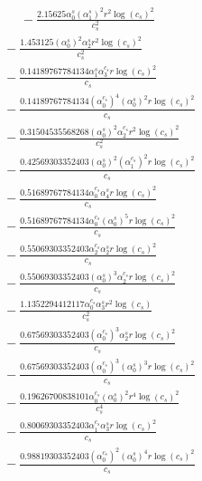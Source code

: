 \documentclass[10pt]{article}
\begin{document}
\begin{align*}
\phantom{R_{3,7}} &\phantom{={}}{}  - \frac{2.15625 \alpha_{0}^s \left(\alpha_{1}^s\right)^{2} r^{2} \log{\left(c_{s} \right)}^{2}}{c_{s}^{2}} \\
&{}  - \frac{1.453125 \left(\alpha_{0}^s\right)^{2} \alpha_{2}^s r^{2} \log{\left(c_{s} \right)}^{2}}{c_{s}^{2}} \\
&{}  - \frac{0.14189767784134 \alpha_{1}^s \alpha_{3}^{c_s} r \log{\left(c_{s} \right)}^{2}}{c_{s}} \\
&{}  - \frac{0.14189767784134 \left(\alpha_{0}^{c_s}\right)^{4} \left(\alpha_{0}^s\right)^{2} r \log{\left(c_{s} \right)}^{2}}{c_{s}} \\
&{}  - \frac{0.31504535568268 \left(\alpha_{0}^s\right)^{2} \alpha_{2}^{c_s} r^{2} \log{\left(c_{s} \right)}^{2}}{c_{s}^{2}} \\
&{}  - \frac{0.42569303352403 \left(\alpha_{0}^s\right)^{2} \left(\alpha_{1}^{c_s}\right)^{2} r \log{\left(c_{s} \right)}^{2}}{c_{s}} \\
&{}  - \frac{0.51689767784134 \alpha_{0}^{c_s} \alpha_{4}^s r \log{\left(c_{s} \right)}^{2}}{c_{s}} \\
&{}  - \frac{0.51689767784134 \alpha_{0}^{c_s} \left(\alpha_{0}^s\right)^{5} r \log{\left(c_{s} \right)}^{2}}{c_{s}} \\
&{}  - \frac{0.55069303352403 \alpha_{2}^{c_s} \alpha_{2}^s r \log{\left(c_{s} \right)}^{2}}{c_{s}} \\
&{}  - \frac{0.55069303352403 \left(\alpha_{0}^s\right)^{3} \alpha_{2}^{c_s} r \log{\left(c_{s} \right)}^{2}}{c_{s}} \\
&{}  - \frac{1.1352294412117 \alpha_{0}^{c_s} \alpha_{3}^s r^{2} \log{\left(c_{s} \right)}}{c_{s}^{2}} \\
&{}  - \frac{0.67569303352403 \left(\alpha_{0}^{c_s}\right)^{3} \alpha_{2}^s r \log{\left(c_{s} \right)}^{2}}{c_{s}} \\
&{}  - \frac{0.67569303352403 \left(\alpha_{0}^{c_s}\right)^{3} \left(\alpha_{0}^s\right)^{3} r \log{\left(c_{s} \right)}^{2}}{c_{s}} \\
&{}  - \frac{0.19626700838101 \alpha_{0}^{c_s} \left(\alpha_{0}^s\right)^{2} r^{4} \log{\left(c_{s} \right)}^{2}}{c_{s}^{4}} \\
&{}  - \frac{0.80069303352403 \alpha_{1}^{c_s} \alpha_{3}^s r \log{\left(c_{s} \right)}^{2}}{c_{s}} \\
&{}  - \frac{0.98819303352403 \left(\alpha_{0}^{c_s}\right)^{2} \left(\alpha_{0}^s\right)^{4} r \log{\left(c_{s} \right)}^{2}}{c_{s}} \\

\end{align*}
\end{document}
